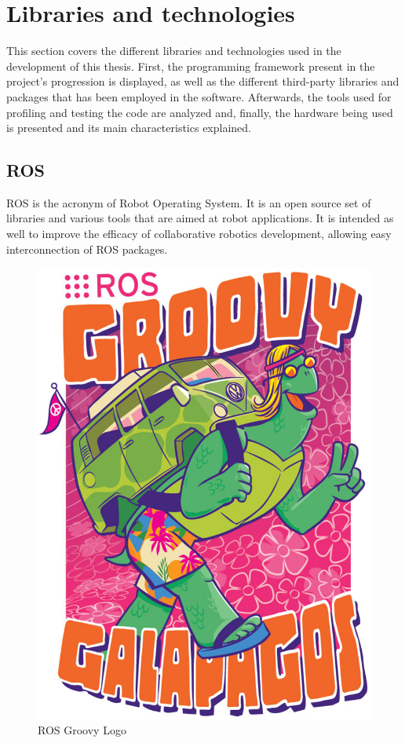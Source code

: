 \section{Libraries and technologies}
\label{libraries_and_technologies}

This section covers the different libraries and technologies used in the development of this thesis. First, the programming framework present in the project's progression is displayed, as well as the different third-party libraries and packages that has been employed in the software. Afterwards, the tools used for profiling and testing the code are analyzed and, finally, the hardware being used is presented and its main characteristics explained. 




	\subsection{ROS}
		\label{ros}

	ROS is the acronym of Robot Operating System\cite{ros}. It is an open source set of libraries and various tools that are aimed at robot applications. It is intended as well to improve the efficacy of collaborative robotics development, allowing easy interconnection of ROS packages. 


	\begin{figure}[h]
		\begin{center}
	    \includegraphics[scale=0.3]{img/ros/groovy.eps}
		\caption[ROS Groovy Logo]{ROS Groovy Logo}
		\end{center}
	\end{figure}

